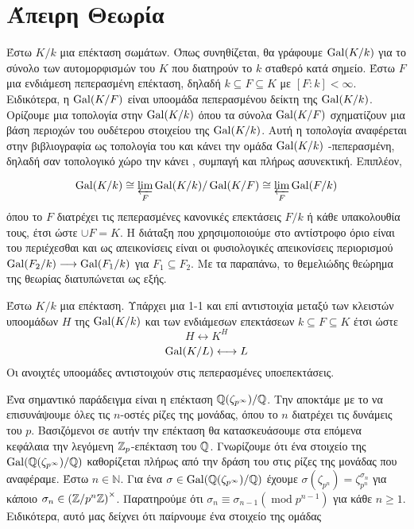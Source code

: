 \section{Άπειρη Θεωρία }

Έστω $K/k$ μια  επέκταση σωμάτων. Όπως συνηθίζεται, θα γράφουμε $\operatorname{Gal}(K/k)$ για το σύνολο των αυτομορφισμών του $K$ που 
διατηρούν το $k$ σταθερό κατά σημείο. Έστω $F$ μια ενδιάμεση πεπερασμένη επέκταση, δηλαδή $k\subseteq F \subseteq K$ με $[F:k]<\infty$. 
Ειδικότερα, η $\operatorname{Gal}(K/F)$ είναι υποομάδα πεπερασμένου δείκτη της $\operatorname{Gal}(K/k)$. Ορίζουμε μια τοπολογία στην $\operatorname{Gal}(K/k)$ όπου τα σύνολα 
$\operatorname{Gal}(K/F)$ σχηματίζουν μια βάση περιοχών του ουδέτερου στοιχείου της $\operatorname{Gal}(K/k)$. Αυτή η τοπολογία αναφέρεται στην βιβλιογραφία ως τοπολογία του  και κάνει την ομάδα $\operatorname{Gal}(K/k)$ -πεπερασμένη, δηλαδή σαν τοπολογικό χώρο την κάνει , συμπαγή και πλήρως ασυνεκτική. Επιπλέον,

$$\operatorname{Gal}(K/k)\cong \varprojlim\limits_F \operatorname{Gal}(K/k)/\operatorname{Gal}(K/F) \cong \varprojlim\limits_F \operatorname{Gal}(F/k)$$ όπου το $F$ διατρέχει τις πεπερασμένες κανονικές επεκτάσεις $F/k$ ή κάθε υπακολουθία τους, έτσι ώστε $\cup F = K$. Η διάταξη που χρησιμοποιούμε στο αντίστροφο όριο είναι του περιέχεσθαι και ως απεικονίσεις είναι οι φυσιολογικές απεικονίσεις περιορισμού $\operatorname{Gal}(F_2/k) \longrightarrow \operatorname{Gal}(F_1/k)$ για $F_1\subseteq F_2$. Με τα παραπάνω, το θεμελιώδης θεώρημα της θεωρίας  διατυπώνεται ως εξής.

\begin{theorem}
    Έστω $K/k$ μια  επέκταση. Υπάρχει μια 1-1 και επί αντιστοιχία μεταξύ των κλειστών υποομάδων $H$ της $\operatorname{Gal}(K/k)$ και των 
    ενδιάμεσων επεκτάσεων $k\subseteq F \subseteq K$ έτσι ώστε 
    $$H\longleftrightarrow K^H$$
    $$\operatorname{Gal}(K/L) \longleftrightarrow L$$ 
    Οι ανοιχτές υποομάδες αντιστοιχούν στις πεπερασμένες υποεπεκτάσεις.
\end{theorem}


\noindent Ένα σημαντικό παράδειγμα είναι η επέκταση $\mathbb{Q}(\zeta_{p^\infty})/\mathbb{Q}$. Την αποκτάμε με το να επισυνάψουμε όλες τις $n$-οστές 
ρίζες της μονάδας, όπου το $n$ διατρέχει τις δυνάμεις του $p$. Βασιζόμενοι σε αυτήν την επέκταση θα κατασκευάσουμε στα επόμενα κεφάλαια 
την λεγόμενη $\mathbb{Z}_p$-επέκταση του $\mathbb{Q}$. Γνωρίζουμε ότι ένα στοιχείο της $\operatorname{Gal}(\mathbb{Q}(\zeta_{p^\infty})/\mathbb{Q})$ καθορίζεται πλήρως από την 
δράση του στις ρίζες της μονάδας που αναφέραμε. Έστω $n \in \mathbb{N}$. Για ένα $\sigma \in \operatorname{Gal}(\mathbb{Q}(\zeta_{p^\infty})/\mathbb{Q})$ έχουμε 
$\sigma(\zeta_{p^n}) = \zeta^{\sigma_n}_{p^n}$ για κάποιο $\sigma_n \in \left(\mathbb{Z}/p^n\mathbb{Z}\right)^\times$. Παρατηρούμε ότι 
$\sigma_n \equiv \sigma_{n-1}(\operatorname{mod}p^{n-1})$ για κάθε $n\geq 1$. Ειδικότερα, αυτό μας δείχνει ότι παίρνουμε ένα 
στοιχείο της ομάδας

